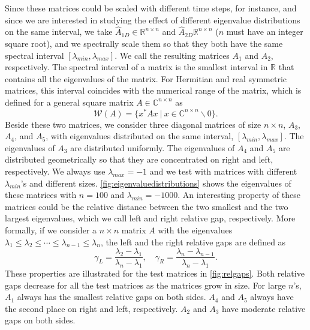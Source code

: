 Since these matrices could be scaled with different time steps, for instance, and since we are interested in studying
the effect of different eigenvalue distributions on the same interval, we take $\hat{A}_{1D} \in \mathbb{R}^{n \times n}$
and $\hat{A}_{2D} \mathbb{R}^{n \times n}$ ($n$ must have an integer square root), and we spectrally scale them so that
they both have the same spectral interval $[\lambda_{min}, \lambda_{max}]$. We call the resulting matrices $A_1$ and $A_2$,
respectively. The spectral interval of a matrix is the smallest interval in $\mathbb{R}$ that contains all the eigenvalues
of the matrix. For Hermitian and real symmetric matrices, this interval coincides with the numerical range of the matrix,
which is defined for a general square matrix
$A \in \mathbb{C}^{n \times n}$ as
\begin{equation}
    \label{eq:numericalrange}
    \mathcal{W}(A) = \{x^* A x \:|\: x \in \mathbb{C}^{n \times n} \backslash {0} \}.
\end{equation}
Beside these two matrices, we consider three diagonal matrices of size $n \times n$, $A_3$, $A_4$, and $A_5$, with eigenvalues
distributed on the same interval, $[\lambda_{min}, \lambda_{max}]$. The eigenvalues of $A_3$ are distributed uniformly. The
eigenvalues of $A_4$ and $A_5$ are distributed geometrically so that they are concentrated on right and left, respectively.
We always use $\lambda_{max} = -1$ and we test with matrices with different $\lambda_{min}$'s and different sizes.
\autoref{fig:eigenvaluedistributions} shows the eigenvalues of these matrices with $n=100$ and $\lambda_{min} = -1000$.
An interesting property of these matrices could be the relative distance between the two smallest and the two largest eigenvalues,
which we call left and right relative gap, respectively. More formally, if we consider a $n \times n$ matrix $A$ with the
eigenvalues $\lambda_1 \le \lambda_2 \le \cdots \le \lambda_{n-1} \le \lambda_n$, the left and the right relative gaps are
defined as
\begin{equation}
    \label{eq:relativegaps}
    \gamma_L = \frac{\lambda_2 - \lambda_1}{\lambda_n - \lambda_1}, \quad
    \gamma_R = \frac{\lambda_n - \lambda_{n-1}}{\lambda_n - \lambda_1}.
\end{equation}
These properties are illustrated for the test matrices in \autoref{fig:relgaps}. Both relative gaps decrease for all the test
matrices as the matrices grow in size. For large $n$'s, $A_1$ always has the smallest relative gaps on both sides. $A_4$ and
$A_5$ always have the second place on right and left, respectively. $A_2$ and $A_3$ have moderate relative gaps on both sides.

